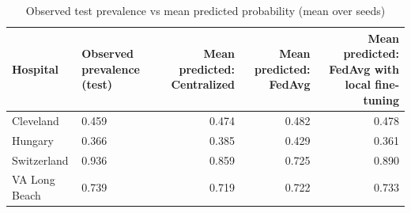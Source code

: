 \begin{table}[ht]
\centering
\small
\caption{Observed test prevalence vs mean predicted probability (mean over seeds)}
\label{tab:table9_calibration_in_the_large}
\begin{tabular}{llrrr}
\toprule
Hospital & Observed prevalence (test) & Mean predicted: Centralized & Mean predicted: FedAvg & Mean predicted: FedAvg with local fine-tuning \\
\midrule
Cleveland & 0.459 & 0.474 & 0.482 & 0.478 \\
Hungary & 0.366 & 0.385 & 0.429 & 0.361 \\
Switzerland & 0.936 & 0.859 & 0.725 & 0.890 \\
VA Long Beach & 0.739 & 0.719 & 0.722 & 0.733 \\
\bottomrule
\end{tabular}
\end{table}
